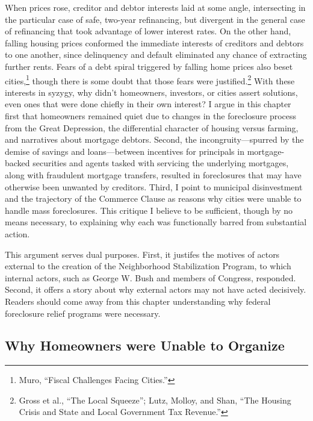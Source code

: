 \documentclass[
]{article}
\let\rmarkdownfootnote\footnote%
\def\footnote{\protect\rmarkdownfootnote}
\begin{document}
When prices rose, creditor and debtor interests laid at some angle,
intersecting in the particular case of safe, two-year refinancing, but
divergent in the general case of refinancing that took advantage of
lower interest rates. On the other hand, falling housing prices
conformed the immediate interests of creditors and debtors to one
another, since delinquency and default eliminated any chance of
extracting further rents. Fears of a debt spiral triggered by falling
home prices also beset cities,\footnote{Muro, ``Fiscal Challenges Facing
  Cities.''} though there is some doubt that those fears were
justified.\footnote{Gross et al., ``The Local Squeeze''; Lutz, Molloy,
  and Shan, ``The Housing Crisis and State and Local Government Tax
  Revenue.''} With these interests in syzygy, why didn't homeowners,
investors, or cities assert solutions, even ones that were done chiefly
in their own interest? I argue in this chapter first that homeowners
remained quiet due to changes in the foreclosure process from the Great
Depression, the differential character of housing versus farming, and
narratives about mortgage debtors. Second, the incongruity---spurred by
the demise of savings and loans---between incentives for principals in
mortgage-backed securities and agents tasked with servicing the
underlying mortgages, along with fraudulent mortgage transfers, resulted
in foreclosures that may have otherwise been unwanted by creditors.
Third, I point to municipal disinvestment and the trajectory of the
Commerce Clause as reasons why cities were unable to handle mass
foreclosures. This critique I believe to be sufficient, though by no
means necessary, to explaining why each was functionally barred from
substantial action.

This argument serves dual purposes. First, it justifes the motives of
actors external to the creation of the Neighborhood Stabilization
Program, to which internal actors, such as George W. Bush and members of
Congress, responded. Second, it offers a story about why external actors
may not have acted decisively. Readers should come away from this
chapter understanding why federal foreclosure relief programs were
necessary.

\hypertarget{homeowners}{%
\subsection{Why Homeowners were Unable to Organize}\label{homeowners}}
\end{document}

